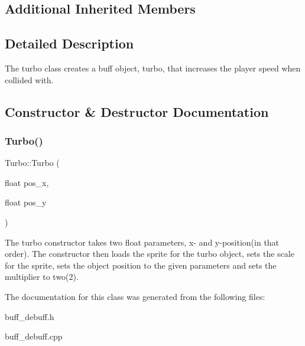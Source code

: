 \subsection*{Additional Inherited Members}


\subsection{Detailed Description}
The turbo class creates a buff object, turbo, that increases the player speed when collided with. 

\subsection{Constructor \& Destructor Documentation}
\mbox{\label{classTurbo_a11c88626d73b3b4d3462e4b96f4b715c}} 
\subsubsection{\texorpdfstring{Turbo()}{Turbo()}}
{\footnotesize\ttfamily Turbo\+::\+Turbo (\begin{DoxyParamCaption}\item[{float}]{pos\+\_\+x,  }\item[{float}]{pos\+\_\+y }\end{DoxyParamCaption})}

The turbo constructor takes two float parameters, x-\/ and y-\/position(in that order). The constructor then loads the sprite for the turbo object, sets the scale for the sprite, sets the object position to the given parameters and sets the multiplier to two(2). 

The documentation for this class was generated from the following files\+:\begin{DoxyCompactItemize}
\item 
buff\+\_\+debuff.\+h\item 
buff\+\_\+debuff.\+cpp\end{DoxyCompactItemize}
